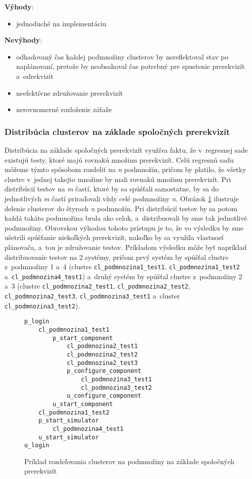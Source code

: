 \noindent \textbf{Výhody}:
\begin{itemize}
\item jednoduché na implementáciu
\end{itemize} 

\noindent \textbf{Nevýhody}:
\begin{itemize}
\item odhadovaný čas každej podmnožiny clusterov by nereflektoval stav po naplánovaní, pretože by
neobsahoval čas potrebný pre spustenie prerekvizít a~odrekvizít
\item neefektívne združovanie prerekvizít
\item nerovnomerné rozloženie záťaže
\end{itemize}

\subsubsection*{Distribúcia clusterov na základe spoločných prerekvizít}
Distribúcia na základe spoločných prerekvizít využíva faktu, že v~regresnej sade existujú testy, ktoré majú rovnakú množinu prerekvizít.
Celú regresnú sadu môžeme týmto spôsobom rozdeliť na \emph{n} podmnožín, pričom by platilo, že všetky clustre v~jednej takejto množine by mali
rovnakú množinu prerekvizít. Pri distribúcií testov na \emph{m} častí, ktoré by sa spúšťali samostatne, by sa do jednotlivých \emph{m} častí
priraďovali vždy celé podmnožiny \emph{n}. Obrázok \ref{fig:podmnoziny_testov} ilustruje delenie clusterov do štyroch \emph{n} podmnožín.
Pri distribúcií testov by sa potom každá takáto podmnožina brala ako celok, a~distribuovali by sme tak jednotlivé podmnožiny.
Obrovskou výhodou tohoto prístupu je to, že vo výsledku by sme ušetrili spúšťanie niekoľkých prerekvizít, nakoľko by sa
využila vlastnosť plánovača, a~tou je združovanie testov. Príkladom výsledku môže byť napríklad distribuovanie testov na 2 systémy, 
pričom prvý systém by spúšťal clustre z~podmnožiny 1 a~4 (clustre \texttt{cl\_podmnozina1\_test1}, \texttt{cl\_podmnozina1\_test2} a~\texttt{cl\_podmnozina4\_test1})
a~druhý systém by spúšťal clustre z~podmnožiny 2 a~3 (clustre \texttt{cl\_podmnozina2\_test1}, \texttt{cl\_podmnozina2\_test2}, 
\texttt{cl\_podmnozina2\_test3}, \texttt{cl\_podmnozina3\_test1} a~cluster \texttt{cl\_podmnozina3\_test2}).


\begin{figure}[h]
\begin{lstlisting}
p_login
    cl_podmnozina1_test1
        p_start_component
            cl_podmnozina2_test1
            cl_podmnozina2_test2
            cl_podmnozina2_test3
            p_configure_component
                cl_podmnozina3_test1
                cl_podmnozina3_test2
            u_configure_component
        u_start_component
    cl_podmnozina1_test2
    p_start_simulator
        cl_podmnozina4_test1
    u_start_simulator
u_login
\end{lstlisting}
\caption{Príklad rozdeľovania clusterov na podmnožiny na základe spoločných prerekvizít}
\label{fig:podmnoziny_testov}
\end{figure}

